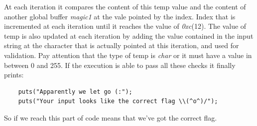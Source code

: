 \documentclass{article}
\begin{document}
At each iteration it compares the content of this temp value and the content of another global buffer \textit{magic1} at the vale pointed by the index. Index that is incremented at each iteration until it reaches the value of \textit{0xc}(12).
The value of temp is also updated at each iteration by adding the value contained in the input string at the character that is actually pointed at this iteration, and used for validation.
Pay attention that the type of temp is \textit{char} or it must have a value in between 0 and 255.
If the execution is able to pass all these checks it finally prints:
\begin{verbatim}
    puts("Apparently we let go (:");
    puts("Your input looks like the correct flag \\(^o^)/");
\end{verbatim}
So if we reach this part of code means that we've got the correct flag.
\end{document}
